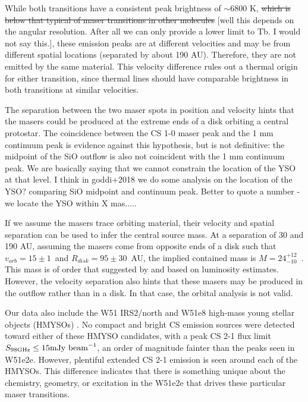 \documentclass[twocolumn]{aastex62}
\begin{document}
While both transitions have a consistent peak brightness of $\sim6800$ K,
\sout{which is below that typical of maser transitions in other molecules}
{\color{red} [well this depends on the angular resolution. After all we can only provide a lower limit to Tb. I would not say this.]}, these
emission peaks are at different velocities and may be from different spatial
locations (separated
by about 190 AU).  Therefore, they are not emitted by the same material.
This velocity difference rules out a thermal origin for either transition,
since thermal lines should have comparable brightness in both transitions
at similar velocities.

The separation between the two maser spots in position and velocity hints
that the masers could be produced at the extreme ends of a disk orbiting
a central protostar.  The coincidence between the CS 1-0 maser peak and
the 1 mm continuum peak is evidence against this hypothesis, but is not definitive:
the midpoint of the SiO outflow is also not coincident with the 1 mm continuum
peak.
{\color{red} We are basically saying that we cannot constrain the location of the YSO at that level. I think in goddi+2018 we do some analysis on the location of the YSO? comparing SiO midpoint and continuum peak. Better to quote a number - we locate the YSO within X mas.....}

If we assume the masers trace orbiting material, their velocity and spatial
separation can be used to infer the central source mass.  At a separation of 30
\kms and 190 AU, assuming the masers come from opposite ends of a disk such
that $v_{orb}=15\pm1$~\kms and $R_{disk}=95\pm30$~AU, the implied contained mass is
$M=24_{-10}^{+12}$~\msun.  This mass is of order that suggested by
\citet{Ginsburg2017a} and \citet{Goddi2018a} based on luminosity estimates.
However, the velocity separation also hints that these masers may be produced
in the outflow rather than in a disk.  In that case, the orbital analysis
is not valid.


Our data also include the W51 IRS2/north and W51e8 high-mass young stellar
objects (HMYSOs) \citep{Ginsburg2017a}.  No compact and bright CS emission
sources were detected
toward either of these HMYSO candidates, with a peak CS 2-1 flux limit ${S_{98
\mathrm{GHz}} \leq 15 \mathrm{mJy~\textrm{beam}^{-1}}}$, an order of magnitude fainter
than the peaks seen in W51e2e.  However, plentiful extended CS 2-1 emission is
seen around each of the HMYSOs.  This difference indicates that there is
something unique about the chemistry, geometry, or excitation in the W51e2e
that drives these particular maser transitions.
\end{document}
